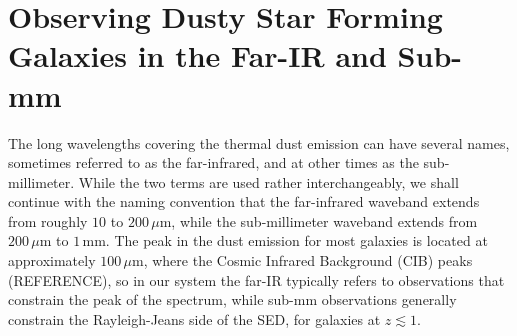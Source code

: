 \section{Observing Dusty Star Forming Galaxies in the Far-IR and Sub-mm}

The long wavelengths covering the thermal dust emission can have several names, sometimes referred to as the far-infrared, and at other times as the sub-millimeter. While the two terms are used rather interchangeably, we shall continue with the naming convention that the far-infrared waveband extends from roughly $10$ to $200\,\mu$m, while the sub-millimeter waveband extends from $200\,\mu$m to $1\,$mm. The peak in the dust emission for most galaxies is located at approximately $100\,\mu$m, where the Cosmic Infrared Background (CIB) peaks ({\color{red}REFERENCE}), so in our system the far-IR typically refers to observations that constrain the peak of the spectrum, while sub-mm observations generally constrain the Rayleigh-Jeans side of the SED, for galaxies at $z \lesssim 1$.

